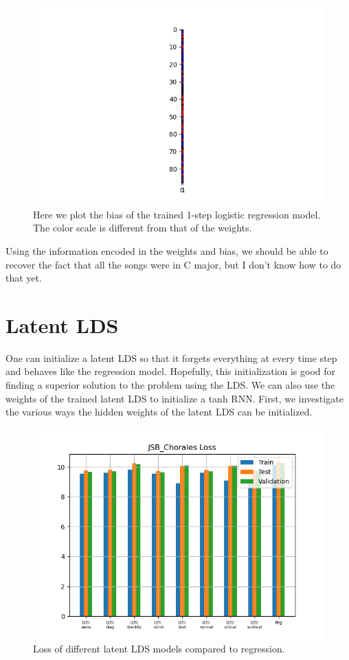 \documentclass{article}
\begin{document}
\begin{figure}
    \centering
    \includegraphics{figures/regression_bias.png}
    \caption{Here we plot the bias of the trained 1-step logistic regression model. The color scale is different from that of the weights.}
\end{figure}

Using the information encoded in the weights and bias, we should be able to recover the fact that all the songs were in C major, but I don't know how to do that yet.


\section{Latent LDS}

One can initialize a latent LDS so that it forgets everything at every time step and behaves like the regression model. Hopefully, this initialization is good for finding a superior solution to the problem using the LDS. We can also use the weights of the trained latent LDS to initialize a tanh RNN. First, we investigate the various ways the hidden weights of the latent LDS can be initialized.

\begin{figure}
    \centering
    \includegraphics{figures/jsb_lds_losses.png}
    \caption{Loss of different latent LDS models compared to regression.}
\end{figure}
\end{document}
